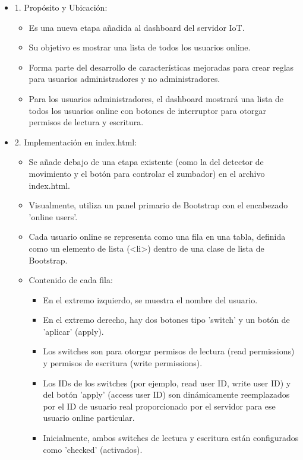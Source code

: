 \documentclass{report}
\begin{document}
\begin{itemize}
    \item 1. Propósito y Ubicación:
    \begin{itemize}
        \item Es una nueva etapa añadida al dashboard del servidor IoT.
        \item Su objetivo es mostrar una lista de todos los usuarios online.
        \item Forma parte del desarrollo de características mejoradas para crear reglas para usuarios administradores y no administradores.
        \item Para los usuarios administradores, el dashboard mostrará una lista de todos los usuarios online con botones de interruptor para otorgar 
        permisos de lectura y escritura.
    \end{itemize}
    \item 2. Implementación en index.html:
    \begin{itemize}
        \item Se añade debajo de una etapa existente (como la del detector de movimiento y el botón para controlar el zumbador) en el archivo index.html.
        \item Visualmente, utiliza un panel primario de Bootstrap con el encabezado 'online users'.
        \item Cada usuario online se representa como una fila en una tabla, definida como un elemento de lista (<li>) dentro de una clase de lista de Bootstrap.
        \item Contenido de cada fila:
            \begin{itemize}
                \item En el extremo izquierdo, se muestra el nombre del usuario.
                \item En el extremo derecho, hay dos botones tipo 'switch' y un botón de 'aplicar' (apply).
                \item Los switches son para otorgar permisos de lectura (read permissions) y permisos de escritura (write permissions).
                \item Los IDs de los switches (por ejemplo, read user ID, write user ID) y del botón 'apply' (access user ID) son dinámicamente 
                reemplazados por el ID de usuario real proporcionado por el servidor para ese usuario online particular.
                \item Inicialmente, ambos switches de lectura y escritura están configurados como 'checked' (activados).

\end{itemize}
\end{itemize}
\end{itemize}
\end{document}
